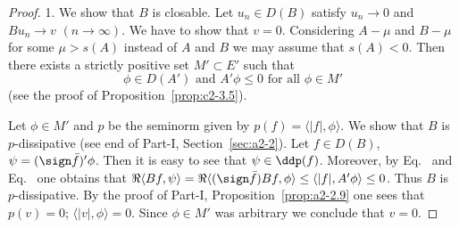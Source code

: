 \begin{proof}
1. We show that $B$ is closable.
Let $u_{n} \in D(B)$ satisfy $u_{n} \to 0$ and $Bu_{n} \to v$ $(n \to \infty)$.
We have to
show that $v = 0$. 
Considering $A - \mu$ and $B - \mu$ for some $\mu > s(A)$ instead of\/ $A$ and $B$ we may assume that $s(A) < 0$. 
Then there exists a strictly positive set $M' \subset E'$ such that
\begin{equation}\label{eq:c2-4.5}
\phi \in D(A') \text{ and } A'\phi \leq 0 \text{ for all } \phi \in M'
\end{equation}
(see the proof of Proposition~\ref{prop:c2-3.5}).

Let $\phi \in M'$ and $p$ be the seminorm given by $p(f) = \langle|f|,\phi\rangle$. 
We show that $B$ is $p$-dissipative (see end of Part-I, Section~\ref{sec:a2-2}).
Let $f \in D(B)$, $\psi = (\sign  \bar{f})'\phi$. 
Then it is easy to see that $\psi \in \ddp(f)$. 
Moreover, by Eq.~ and Eq.~ one obtains that 
$\Re\langle Bf,\psi\rangle = \Re\langle(\sign  \bar{f})Bf,\phi\rangle \leq \langle|f|,A'\phi\rangle \leq 0$. 
Thus $B$ is $p$-dissipative. 
By the proof of Part-I, Proposition~\ref{prop:a2-2.9} 
one sees that $p(v) = 0$; \ie $\langle|v|,\phi\rangle = 0$.
Since $\phi \in M'$ was arbitrary we conclude that $v = 0$.


\end{proof}

